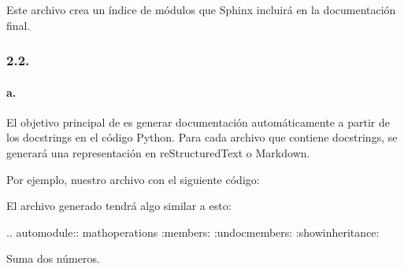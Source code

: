\documentclass[a4paper,10pt,spanish]{sphinxmanual}
\begin{document}
\sphinxAtStartPar
Este archivo crea un índice de módulos que Sphinx incluirá en la documentación final.


\subsubsection{2.2. }
\label{\detokenize{configuracion_inicial/007.Creacion_de_ficheros_de_codigo_y_generacion_automatica_de_documentacion:contenido-de-los-archivos-generados}}

\paragraph{a. }
\label{\detokenize{configuracion_inicial/007.Creacion_de_ficheros_de_codigo_y_generacion_automatica_de_documentacion:a-documentacion-generada-automaticamente-desde-el-codigo}}
\sphinxAtStartPar
El objetivo principal de  es generar documentación automáticamente a partir de los docstrings en el código Python. Para cada archivo  que contiene docstrings, se generará una representación en reStructuredText o Markdown.

\sphinxAtStartPar
Por ejemplo, nuestro archivo  con el siguiente código:

\begin{sphinxVerbatim}[commandchars=\\\{\}]
  
       

\end{sphinxVerbatim}

\sphinxAtStartPar
El archivo  generado tendrá algo similar a esto:

\begin{sphinxVerbatim}[commandchars=\\\{\}]

.. automodule:: math\PYGZus{}operations
   :members:
   :undoc\PYGZhy{}members:
   :show\PYGZhy{}inheritance:


Suma dos números.
\end{sphinxVerbatim}
\end{document}
